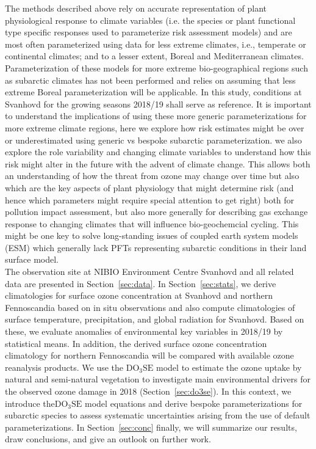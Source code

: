 \documentclass[bg, manuscript]{copernicus}
\begin{document}
The methods described above rely on accurate representation of plant physiological response to climate variables (i.e. the species or plant functional type specific responses used to parameterize risk assessment models) and are most often parameterized using data for less extreme climates, i.e., temperate or continental climates; and to a lesser extent, Boreal and Mediterranean climates. Parameterization of these models for more extreme bio-geographical regions such as subarctic climates has not been performed and relies on assuming that less extreme Boreal parameterization will be applicable. In this study, conditions at Svanhovd for the growing seasons 2018/19 shall serve as reference.
It is important to understand the implications of using these more generic parameterizations for more extreme climate regions, here we explore how risk estimates might be over or underestimated using generic vs bespoke subarctic parameterization. we also explore the role \chem{[O_3]} variability and changing climate variables to understand how this risk might alter in the future with the advent of climate change. This allows both an understanding of how the threat from ozone may change over time but also which are the key aspects of plant physiology that might determine risk (and hence which parameters might require special attention to get right) both for pollution impact assessment, but also more generally for describing gas exchange response to changing climates that will influence bio-geochemcial cycling. This might be one key to solve long-standing issues of coupled earth system models (ESM) which generally lack PFTs representing subarctic conditions in their land surface model.\\

The observation site at NIBIO Environment Centre Svanhovd and all related data are presented in Section~\ref{sec:data}. In Section~\ref{sec:stats}, we derive climatologies for surface ozone concentration at Svanhovd and northern Fennoscandia based on in situ observations and also compute climatologies of surface temperature, precipitation, and global radiation for Svanhovd. Based on these, we evaluate anomalies of environmental key variables in 2018/19 by statistical means. In addition, the derived surface ozone concentration climatology for northern Fennoscandia will be compared with available ozone reanalysis products. We use the $\mathrm{DO_3SE}$ model to estimate the ozone uptake by natural and semi-natural vegetation to investigate main environmental drivers for the observed ozone damage in 2018 (Section~\ref{sec:do3se}). In this context, we introduce the$\mathrm{DO_3SE}$ model equations and derive bespoke parameterizations for subarctic species to assess systematic uncertainties arising from the use of default parameterizations. In Section~\ref{sec:conc} finally, we will summarize our results, draw conclusions, and give an outlook on further work.
\end{document}
